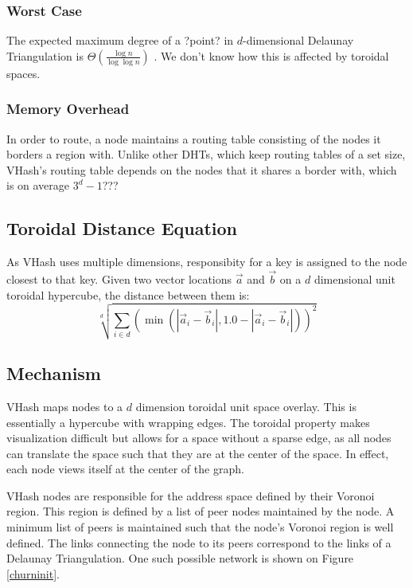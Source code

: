 \documentclass{IEEEtran}
\begin{document}
\subsubsection{Worst Case}


The expected maximum degree of a ?point?  in $d$-dimensional Delaunay Triangulation is $\Theta(\frac{\log n}{\log \log n} )$ \cite{bern1991expected}.  We don't know how this is affected by toroidal spaces.



\subsubsection{Memory Overhead}
In order to route, a node maintains a routing table consisting of the nodes it borders a region with.  Unlike other DHTs, which keep routing tables of a set size, VHash's routing table depends on the nodes that it shares a border with, which is on average $3^d -1$???


 
\subsection{Toroidal Distance Equation}
As VHash uses multiple dimensions, responsibity for a key is assigned to the node closest to that key. Given two vector locations $\vec{a}$ and $\vec{b}$ on a  $d$ dimensional unit toroidal hypercube, the distance between them is:
\[  \sqrt[d]{\sum\limits_{i\in d} (\min(|\vec{a}_i-\vec{b}_i|, 1.0-|\vec{a}_i-\vec{b}_i|))^2}\]

\subsection{Mechanism}
VHash maps nodes to a $d$ dimension toroidal unit space overlay. This is essentially a hypercube with wrapping edges. The toroidal property makes visualization difficult but allows for a space without a sparse edge, as all nodes can translate the space such that they are at the center of the space.  In effect, each node views itself at the center of the graph.

VHash nodes are responsible for the address space defined by their Voronoi region. This region is defined by a list of peer nodes maintained by the node. A minimum list of peers is maintained such that the node's Voronoi region is well defined. The links connecting the node to its peers correspond to the links of a Delaunay Triangulation.  One such possible network is shown on Figure \ref{churninit}.
\end{document}
